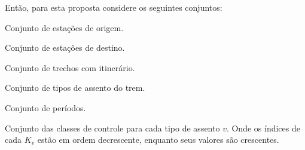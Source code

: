 
Então, para esta proposta considere os seguintes conjuntos:

\begin{description}[style=unboxed, leftmargin=2.5cm, labelindent=1.5cm]
	\setlength{\itemsep}{-2.2em} %
	\setlength{\parskip}{0em} %
	\item[$O:$] Conjunto de estações de origem. \\
	\item[$D:$] Conjunto de estações de destino. \\
	\item[$OD:$] Conjunto de trechos com itinerário. \\
	\item[$V:$] Conjunto de tipos de assento do trem. \\
	\item[$T:$] Conjunto de períodos. \\
	\item[$K_v:$] Conjunto das classes de controle para cada tipo de assento $v$. Onde os índices de cada $K_v$ estão em ordem decrescente, enquanto seus valores são crescentes.
\end{description}

